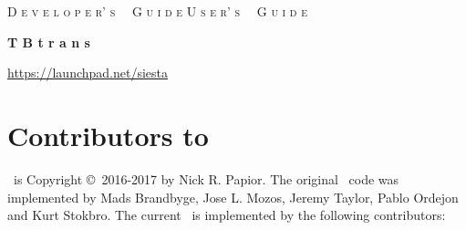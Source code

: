 %
%
%
%



\date{July 5, 2017}




\begin{titlepage}

\begin{center}

\vspace{1cm}
\ifdeveloper
 {\Huge \textsc{D e v e l o p e r' s \, \, G u i d e}}
\else
 {\Huge \textsc{U s e r' s \, \, G u i d e}}
\fi

\vspace{1cm}
\hrulefill
\vspace{1cm}

{\Huge \textbf{T B t r a n s \, \, }}

\vspace{1cm}
\hrulefill
\vspace{0.5cm}

{\Large \printdate}

\vspace{1.5cm}
{\Large \url{https://launchpad.net/siesta}}

\end{center}

\end{titlepage}


\newpage

\section*{Contributors to \tbtrans}

\tbtrans\ is Copyright \copyright\ 2016-2017 by Nick R. Papior. The
original \tbtrans\ code was implemented by Mads Brandbyge, Jose
L. Mozos, Jeremy Taylor, Pablo Ordejon and Kurt Stokbro. The current
\tbtrans\ is implemented by the following contributors:

